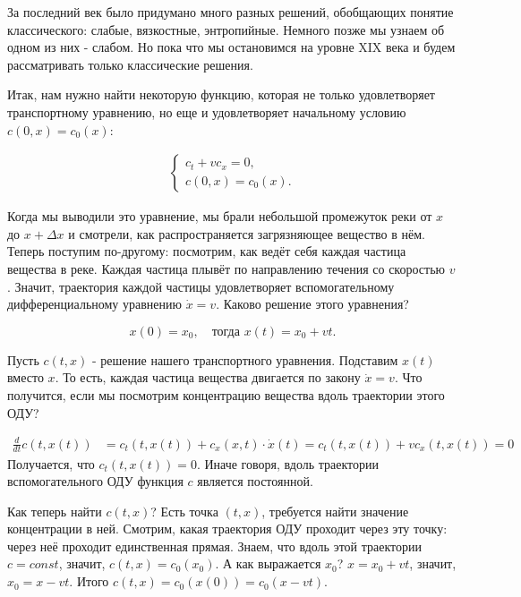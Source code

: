 За последний век было придумано много разных решений, обобщающих понятие классического: слабые, вязкостные, энтропийные. Немного позже мы узнаем об одном из них - слабом. Но пока что мы остановимся на уровне XIX века и будем рассматривать только классические решения.

Итак, нам нужно найти некоторую функцию, которая не только удовлетворяет транспортному уравнению, но еще и удовлетворяет начальному условию $ c (0, x) = c_0 (x) $:

\begin{align}
    \begin{cases} 
        c_t + v c_x = 0, \\
        c (0, x) = c_0 (x).
    \end{cases}
\label{transport}
\end{align}

Когда мы выводили это уравнение, мы брали небольшой промежуток реки от $x$ до $ x + \Delta x $ и смотрели, как распространяется загрязняющее вещество в нём. Теперь поступим по-другому: посмотрим, как ведёт себя каждая частица вещества в реке. Каждая частица плывёт по направлению течения со скоростью $v$. Значит, траектория каждой частицы удовлетворяет вспомогательному дифференциальному уравнению $ \dot x = v $. Каково решение этого уравнения?

\[
	x(0) = x_0,\quad \text{тогда } x(t) = x_0 + v t .
\]


Пусть $ c (t, x) $ - решение нашего транспортного уравнения. Подставим $ x(t) $ вместо $x$. То есть, каждая частица вещества двигается по закону $ \dot x = v $. Что получится, если мы посмотрим концентрацию вещества вдоль траектории этого ОДУ?

\begin{align*}
    \frac {d} {dt} c (t, x(t)) & = c_t (t, x(t)) + c_x (x, t) \cdot \dot x (t) = c_t (t, x(t)) + v c_x (t, x(t)) = 0
\end{align*}
Получается, что $ c_t (t, x(t)) = 0 $. Иначе говоря, вдоль траектории вспомогательного ОДУ функция $c$ является постоянной.




Как теперь найти $ c (t,x) $? Есть точка $ (t, x) $, требуется найти значение концентрации в ней. Смотрим, какая траектория ОДУ проходит через эту точку: через неё проходит единственная прямая. Знаем, что вдоль этой траектории $ c = const $, значит, $ c (t, x) = c_0 (x_0) $. А как выражается $ x_0 $? $ x = x_0 + v t $, значит, $ x_0 = x - vt $.
Итого $c(t,x) = c_0(x(0)) = c_0(x-vt)$.

